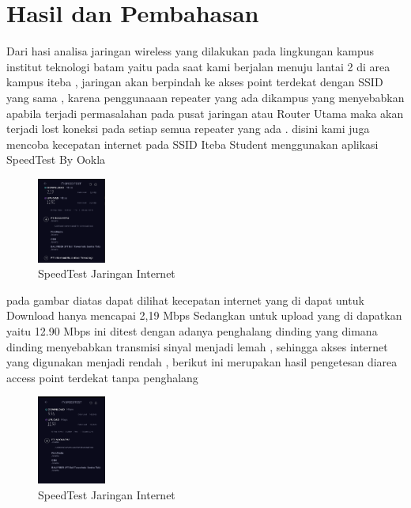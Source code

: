 \documentclass[conference]{IEEEtran}
\begin{document}
\section{Hasil dan Pembahasan}

Dari hasi analisa jaringan wireless yang dilakukan pada lingkungan kampus
institut teknologi batam yaitu pada saat kami berjalan menuju lantai 2 di area kampus iteba , jaringan akan berpindah
ke akses point terdekat dengan SSID yang sama , karena penggunaaan repeater yang ada dikampus yang menyebabkan apabila terjadi permasalahan
pada pusat jaringan atau Router Utama maka akan terjadi lost koneksi pada setiap semua repeater yang ada .
disini kami juga mencoba kecepatan internet pada SSID Iteba Student menggunakan aplikasi SpeedTest By Ookla

\begin{figure}[h]
    \centering
    \includegraphics[width=0.2\textwidth]{5.png}
    \caption{SpeedTest Jaringan Internet}
\end{figure}

\vspace{5cm}


pada gambar diatas dapat dilihat kecepatan internet yang di dapat untuk Download hanya mencapai 2,19 Mbps Sedangkan untuk upload  yang
di dapatkan yaitu 12.90 Mbps ini ditest dengan adanya penghalang dinding yang dimana dinding menyebabkan transmisi sinyal menjadi lemah , 
sehingga akses internet yang digunakan menjadi rendah , berikut ini merupakan hasil pengetesan diarea access point terdekat tanpa penghalang

\begin{figure}[h]
    \centering
    \includegraphics[width=0.2\textwidth]{6.png}
    \caption{SpeedTest Jaringan Internet}
\end{figure}
\end{document}
